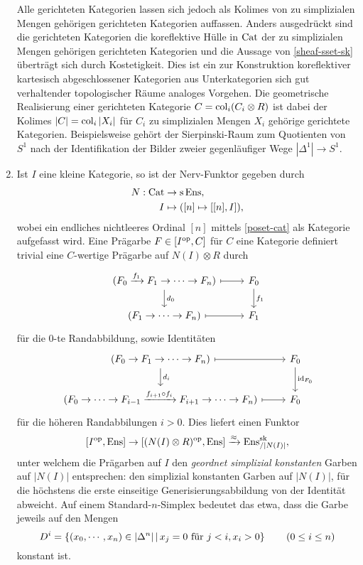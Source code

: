\begin{enumerate}
  Alle gerichteten Kategorien lassen sich jedoch als Kolimes von zu
  simplizialen Mengen gehörigen gerichteten Kategorien
  auffassen. Anders ausgedrückt sind die gerichteten Kategorien die
  koreflektive Hülle in $\operatorname{Cat}$ der zu simplizialen Mengen gehörigen
  gerichteten Kategorien und die Aussage von \ref{sheaf-sset-sk}
  überträgt sich durch Kostetigkeit. Dies ist ein zur Konstruktion
  koreflektiver kartesisch abgeschlossener Kategorien aus
  Unterkategorien sich gut verhaltender topologischer Räume analoges
  Vorgehen. Die geometrische Realisierung einer gerichteten Kategorie
  $C = \operatorname{col}_i (C_i \otimes R)$ ist dabei der Kolimes $|C| = \operatorname{col}_i
  |X_i|$ für $C_i$ zu simplizialen Mengen $X_i$ gehörige gerichtete
  Kategorien. Beispielsweise gehört der Sierpinski-Raum zum Quotienten
  von $S^1$ nach der Identifikation der Bilder zweier gegenläufiger
  Wege $|\Delta^1| \to S^1$.
\item Ist $I$ eine kleine Kategorie, so ist der Nerv-Funktor gegeben
  durch 
  \begin{align*}
    N: \operatorname{Cat} &\to \operatorname{s}\operatorname{Ens}, \\
    I &\mapsto ([n] \mapsto [ [n], I]),
  \end{align*}
  wobei ein endliches nichtleeres Ordinal $[n]$ mittels
  \ref{poset-cat} als Kategorie aufgefasst wird. Eine Prägarbe $F \in
      [I^\mathrm{op}, C]$ für $C$ eine Kategorie definiert trivial eine
      $C$-wertige Prägarbe auf $N(I) \otimes R$ durch
  \[ \begin{tikzcd}
    (F_0 \xrightarrow{f_1} F_1 \to \cdots \to F_n) \dar{d_0} \rar[mapsto]
    & F_0 \dar{f_1} \\
    (F_1 \to \cdots \to F_n) \rar[mapsto]
    & F_1
  \end{tikzcd} \]
  für die $0$-te Randabbildung, sowie Identitäten
  \[ \begin{tikzcd}
    (F_0 \to F_1 \to \cdots \to F_n) \dar{d_i} \rar[mapsto]
    & F_0 \dar{\id_{F_0}} \\
    (F_0 \to \cdots \to F_{i-1}
    \xrightarrow{f_{i+1} \circ f_i} F_{i+1} \to \cdots \to F_n) \rar[mapsto]
    & F_0
  \end{tikzcd} \]
  für die höheren Randabbilungen $i > 0$. Dies liefert einen Funktor
  \[ [I^\mathrm{op}, \operatorname{Ens}] \to [(N(I) \otimes R)^\mathrm{op}, \operatorname{Ens}] \xrightarrow{\approx} \operatorname{Ens}^{\operatorname{sk}}_{/|N(I)|}, \]
  unter welchem die Prägarben auf $I$ den \emph{geordnet simplizial
    konstanten} Garben auf $|N(I)|$ entsprechen: den simplizial
  konstanten Garben auf $|N(I)|$, für die höchstens die erste
  einseitige Generisierungsabbildung von der Identität abweicht. Auf
  einem Standard-$n$-Simplex bedeutet das etwa, dass die Garbe jeweils
  auf den Mengen
  \[ D^i = \left\{ (x_0, \cdots, x_n) \in |\Delta^n| \,\middle|\, x_j = 0 \text{ für } j < i, x_i > 0  \right\} \qquad (0 \leq i \leq n)
    \]
  konstant ist.
\end{enumerate}
